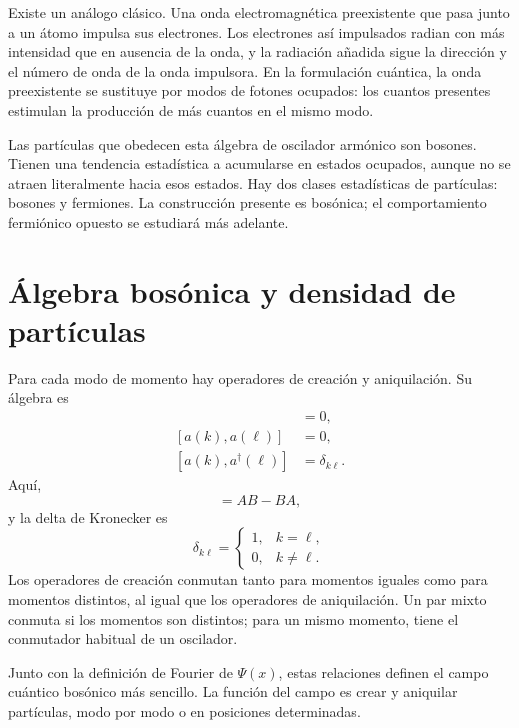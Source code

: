 Existe un análogo clásico. Una onda electromagnética preexistente que pasa junto a un átomo impulsa sus electrones. Los electrones así impulsados radian con más intensidad que en ausencia de la onda, y la radiación añadida sigue la dirección y el número de onda de la onda impulsora. En la formulación cuántica, la onda preexistente se sustituye por modos de fotones ocupados: los cuantos presentes estimulan la producción de más cuantos en el mismo modo.

Las partículas que obedecen esta álgebra de oscilador armónico son bosones. Tienen una tendencia estadística a acumularse en estados ocupados, aunque no se atraen literalmente hacia esos estados. Hay dos clases estadísticas de partículas: bosones y fermiones. La construcción presente es bosónica; el comportamiento fermiónico opuesto se estudiará más adelante.

\section{Álgebra bosónica y densidad de partículas}

Para cada modo de momento hay operadores de creación y aniquilación. Su álgebra es
\begin{align}
[a^\dagger(k),a^\dagger(\ell)]&=0,\\
[a(k),a(\ell)]&=0,\\
[a(k),a^\dagger(\ell)]&=\delta_{k\ell}.
\end{align}
Aquí,
\begin{equation}
[A,B]=AB-BA,
\end{equation}
y la delta de Kronecker es
\begin{equation}
\delta_{k\ell}=
\begin{cases}
1,&k=\ell,\\
0,&k\ne\ell.
\end{cases}
\end{equation}
Los operadores de creación conmutan tanto para momentos iguales como para momentos distintos, al igual que los operadores de aniquilación. Un par mixto conmuta si los momentos son distintos; para un mismo momento, tiene el conmutador habitual de un oscilador.

Junto con la definición de Fourier de \(\Psi(x)\), estas relaciones definen el campo cuántico bosónico más sencillo. La función del campo es crear y aniquilar partículas, modo por modo o en posiciones determinadas.

